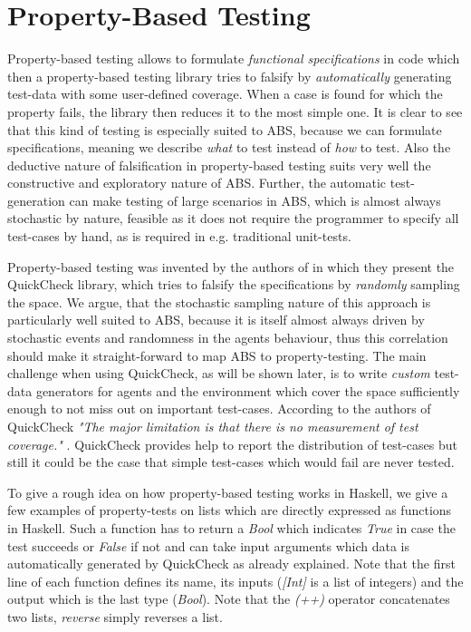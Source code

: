 \section{Property-Based Testing}
\label{sec:proptesting}

Property-based testing allows to formulate \textit{functional specifications} in code which then a property-based testing library tries to falsify by \textit{automatically} generating test-data with some user-defined coverage. When a case is found for which the property fails, the library then reduces it to the most simple one. It is clear to see that this kind of testing is especially suited to ABS, because we can formulate specifications, meaning we describe \textit{what} to test instead of \textit{how} to test. Also the deductive nature of falsification in property-based testing suits very well the constructive and exploratory nature of ABS. Further, the automatic test-generation can make testing of large scenarios in ABS, which is almost always stochastic by nature, feasible as it does not require the programmer to specify all test-cases by hand, as is required in e.g. traditional unit-tests.

Property-based testing was invented by the authors of \cite{claessen_quickcheck_2000,claessen_testing_2002} in which they present the QuickCheck library, which tries to falsify the specifications by \textit{randomly} sampling the space. We argue, that the stochastic sampling nature of this approach is particularly well suited to ABS, because it is itself almost always driven by stochastic events and randomness in the agents behaviour, thus this correlation should make it straight-forward to map ABS to property-testing. The main challenge when using QuickCheck, as will be shown later, is to write \textit{custom} test-data generators for agents and the environment which cover the space sufficiently enough to not miss out on important test-cases. According to the authors of QuickCheck \textit{"The major limitation is that there is no measurement of test coverage."} \cite{claessen_quickcheck_2000}. QuickCheck provides help to report the distribution of test-cases but still it could be the case that simple test-cases which would fail are never tested.

To give a rough idea on how property-based testing works in Haskell, we give a few examples of property-tests on lists which are directly expressed as functions in Haskell. Such a function has to return a \textit{Bool} which indicates \textit{True} in case the test succeeds or \textit{False} if not and can take input arguments which data is automatically generated by QuickCheck as already explained. Note that the first line of each function defines its name, its inputs (\textit{[Int]} is a list of integers) and the output which is the last type (\textit{Bool}). Note that the \textit{(++)} operator concatenates two lists, \textit{reverse} simply reverses a list.

